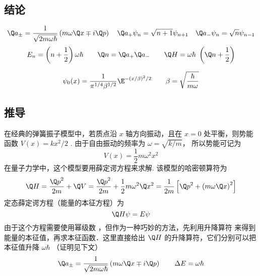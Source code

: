 

\subsection{结论}
\begin{equation}
{\Q a_ \pm } = \frac{1}{{\sqrt {2m\omega \hbar } }}\left( {m\omega \Q x \mp i\Q p} \right)
\quad
{\Q a_ + }{\psi_n} = \sqrt {n + 1}    {\psi_{n + 1}}
\quad
{\Q a_ - }{\psi_n} = \sqrt n    {\psi_{n - 1}}
\end{equation}
\begin{equation}
 {E_n} = \left( {n+\frac{1}{2} } \right)\omega \hbar
\qquad
\Q n = {\Q a_ + }{\Q a_ - }
\qquad
\Q H = \omega \hbar {\text{ }}\left( {\Q n + \frac{1}{2}} \right)
\end{equation}

\begin{equation}
\psi_0 (x) = \frac{1}{{{\pi ^{1/4}}{\beta ^{1/2}}}}{\E^{ - {{(x/\beta )}^2}/2}}  \qquad \beta  = \sqrt {\frac{\hbar }{{m\omega }}}
\end{equation}

\subsection{推导}
在经典的弹簧振子模型中，若质点沿 $x$ 轴方向振动，且在 $x = 0$ 处平衡，则势能函数 $V\left( x \right) = k{x^2}/{2}$ . 由于自由振动的频率为 $\omega  = \sqrt {{k}/{m}} $， 所以势能可记为
\begin{equation}
  V\left( x \right) = \frac{1}{2}m{\omega ^2}{x^2}
\end{equation}
在量子力学中，这个模型要用薛定谔方程来求解. 该模型的哈密顿算符为
\begin{equation}
  \Q H = \frac{{{{\Q p}^2}}}{{2m}} + \Q V = \frac{{{{\Q p}^2}}}{{2m}} + \frac{1}{2}m{\omega ^2}{\Q x^2} = \frac{1}{{2m}}\left[ {{{\Q p}^2} + {{\left( {m\omega \Q x} \right)}^2}} \right]
\end{equation}
定态薛定谔方程（能量的本征方程）为
\begin{equation}\label{QSHOop_eq6}
  \Q H\psi  = E\psi
\end{equation}
由于这个方程需要使用幂级数%
，但作为一种巧妙的方法，先利用升降算符%
来得到能量的本征值，再求本征函数．这里直接给出 $\Q H$ 的升降算符，它们分别可以把本征值升降 $\omega\hbar$ （证明见下文）
\begin{equation}
{\Q a_ \pm } = \frac{1}{{\sqrt {2m\omega \hbar } }}\left( {m\omega \Q x \mp i\Q p} \right)
\qquad
\Delta E = \omega \hbar
\end{equation}

